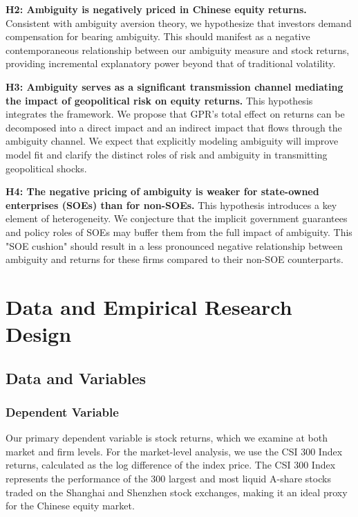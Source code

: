 \documentclass[preprint,12pt,authoryear]{elsarticle}
\begin{document}
\textbf{H2: Ambiguity is negatively priced in Chinese equity returns.}
Consistent with ambiguity aversion theory, we hypothesize that investors demand compensation for bearing ambiguity. This should manifest as a negative contemporaneous relationship between our ambiguity measure and stock returns, providing incremental explanatory power beyond that of traditional volatility.

\textbf{H3: Ambiguity serves as a significant transmission channel mediating the impact of geopolitical risk on equity returns.}
This hypothesis integrates the framework. We propose that GPR's total effect on returns can be decomposed into a direct impact and an indirect impact that flows through the ambiguity channel. We expect that explicitly modeling ambiguity will improve model fit and clarify the distinct roles of risk and ambiguity in transmitting geopolitical shocks.

\textbf{H4: The negative pricing of ambiguity is weaker for state-owned enterprises (SOEs) than for non-SOEs.}
This hypothesis introduces a key element of heterogeneity. We conjecture that the implicit government guarantees and policy roles of SOEs may buffer them from the full impact of ambiguity. This "SOE cushion" should result in a less pronounced negative relationship between ambiguity and returns for these firms compared to their non-SOE counterparts.


\section{Data and Empirical Research Design}
\label{sec:data}

\subsection{Data and Variables}

\subsubsection{Dependent Variable}

Our primary dependent variable is stock returns, which we examine at both market and firm levels. For the market-level analysis, we use the CSI 300 Index returns, calculated as the log difference of the index price. The CSI 300 Index represents the performance of the 300 largest and most liquid A-share stocks traded on the Shanghai and Shenzhen stock exchanges, making it an ideal proxy for the Chinese equity market.
\end{document}
